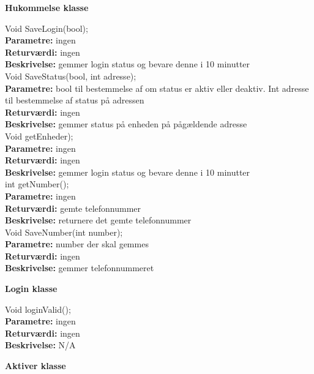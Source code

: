 \vspace*{3\baselineskip}
{\centering
\textbf{Hukommelse klasse}\par
}

Void SaveLogin(bool); \\
\textbf{Parametre:} ingen \\
\textbf{Returværdi:} ingen \\
\textbf{Beskrivelse:} gemmer login status og bevare denne i 10 minutter \\

Void SaveStatus(bool, int adresse); \\
\textbf{Parametre:} bool til bestemmelse af om status er aktiv eller deaktiv. Int adresse til bestemmelse af status på adressen \\
\textbf{Returværdi:} ingen \\
\textbf{Beskrivelse:} gemmer status på enheden på pågældende adresse \\

Void getEnheder); \\
\textbf{Parametre:} ingen \\
\textbf{Returværdi:} ingen \\
\textbf{Beskrivelse:} gemmer login status og bevare denne i 10 minutter \\

int getNumber(); \\
\textbf{Parametre:} ingen \\
\textbf{Returværdi:} gemte telefonnummer \\
\textbf{Beskrivelse:} returnere det gemte telefonnummer \\

Void SaveNumber(int number); \\
\textbf{Parametre:} number der skal gemmes \\
\textbf{Returværdi:} ingen \\
\textbf{Beskrivelse:} gemmer telefonnummeret \\

{\centering 
\textbf{Login klasse}\par
}

Void loginValid(); \\
\textbf{Parametre:} ingen  \\
\textbf{Returværdi:} ingen \\
\textbf{Beskrivelse:} N/A \\

{\centering 
\textbf{Aktiver klasse}\par
}

